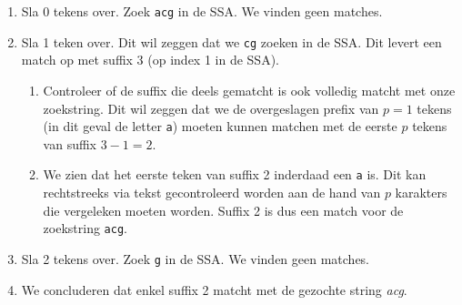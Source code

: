 \begin{enumerate}
    \item Sla 0 tekens over.
    Zoek \texttt{acg} in de SSA\@.
    We vinden geen matches.
    \item Sla 1 teken over.
    Dit wil zeggen dat we \texttt{cg} zoeken in de SSA\@.
    Dit levert een match op met suffix 3 (op index 1 in de SSA).
    \begin{enumerate}
        \item Controleer of de suffix die deels gematcht is ook volledig matcht met onze zoekstring.
        Dit wil zeggen dat we de overgeslagen prefix van $p = 1$ tekens (in dit geval de letter \texttt{a}) moeten kunnen matchen met de eerste $p$ tekens van suffix $3 - 1 = 2$.
        \item We zien dat het eerste teken van suffix 2 inderdaad een \texttt{a} is.
        Dit kan rechtstreeks via tekst gecontroleerd worden aan de hand van $p$ karakters die vergeleken moeten worden.
        Suffix 2 is dus een match voor de zoekstring \texttt{acg}.
    \end{enumerate}
    \item Sla 2 tekens over.
    Zoek \texttt{g} in de SSA\@.
    We vinden geen matches.
    \item We concluderen dat enkel suffix 2 matcht met de gezochte string \textit{acg}.
\end{enumerate}

